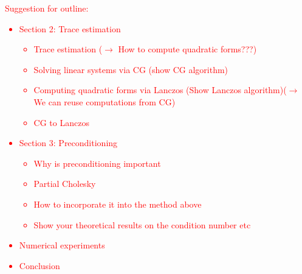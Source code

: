 \documentclass{article}
\begin{document}
{\textcolor{red}{Suggestion for outline: \begin{itemize}
    \item Section 2: Trace estimation
    \begin{itemize}
        \item Trace estimation ($\rightarrow$ How to compute quadratic forms???)
        \item Solving linear systems via CG (show CG algorithm)
        \item Computing quadratic forms via Lanczos (Show Lanczos algorithm)($\rightarrow$ We can reuse computations from CG)
        \item CG to Lanczos
    \end{itemize}
    \item Section 3: Preconditioning
    \begin{itemize}
        \item Why is preconditioning important
        \item Partial Cholesky
        \item How to incorporate it into the method above
        \item Show your theoretical results on the condition number etc
    \end{itemize}
    \item Numerical experiments
    \item Conclusion
\end{itemize}
}

}
\end{document}
